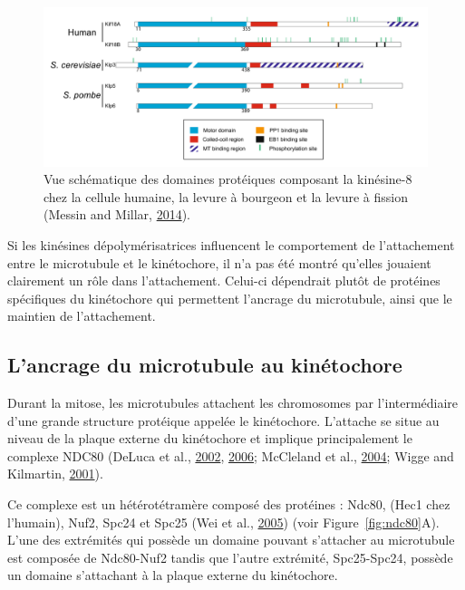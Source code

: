 \documentclass[12pt,a4paper,twoside,openright]{book}
\begin{document}
\begin{figure}[htbp]
\centering
\includegraphics{figures/intro/proteicdomain.png}
\caption[Les domaines protéiques des différentes kinésine-8]{\label{fig:proteicdomain}Vue
schématique des domaines protéiques composant la kinésine-8 chez la
cellule humaine, la levure à bourgeon et la levure à fission (Messin and
Millar, \protect\hyperlink{ref-Messin2014}{2014}).}
\end{figure}

Si les kinésines dépolymérisatrices influencent le comportement de
l'attachement entre le microtubule et le kinétochore, il n'a pas été
montré qu'elles jouaient clairement un rôle dans l'attachement. Celui-ci
dépendrait plutôt de protéines spécifiques du kinétochore qui permettent
l'ancrage du microtubule, ainsi que le maintien de l'attachement.

\subsection{L'ancrage du microtubule au
kinétochore}\label{lancrage-du-microtubule-au-kinuxe9tochore}

Durant la mitose, les microtubules attachent les chromosomes par
l'intermédiaire d'une grande structure protéique appelée le kinétochore.
L'attache se situe au niveau de la plaque externe du kinétochore et
implique principalement le complexe NDC80 (DeLuca et al.,
\protect\hyperlink{ref-DeLuca2002}{2002},
\protect\hyperlink{ref-DeLuca2006}{2006}; McCleland et al.,
\protect\hyperlink{ref-McCleland2004}{2004}; Wigge and Kilmartin,
\protect\hyperlink{ref-Wigge2001}{2001}).

Ce complexe est un hétérotétramère composé des protéines : Ndc80, (Hec1
chez l'humain), Nuf2, Spc24 et Spc25 (Wei et al.,
\protect\hyperlink{ref-Wei2005}{2005}) (voir Figure~\ref{fig:ndc80}A).
L'une des extrémités qui possède un domaine pouvant s'attacher au
microtubule est composée de Ndc80-Nuf2 tandis que l'autre extrémité,
Spc25-Spc24, possède un domaine s'attachant à la plaque externe du
kinétochore.
\end{document}
